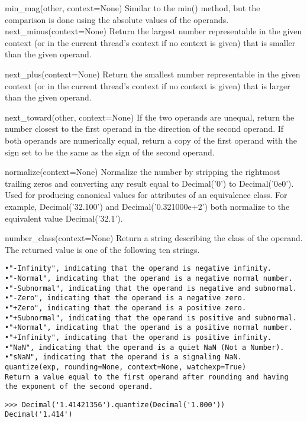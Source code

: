 min\_mag(other, context=None)
Similar to the min() method, but the comparison is done using the absolute values of the operands.
next\_minus(context=None)
Return the largest number representable in the given context (or in the current thread’s context if no context is given) that is smaller than the given operand.

next\_plus(context=None)
Return the smallest number representable in the given context (or in the current thread’s context if no context is given) that is larger than the given operand.

next\_toward(other, context=None)
If the two operands are unequal, return the number closest to the first operand in the direction of the second operand. If both operands are numerically equal, return a copy of the first operand with the sign set to be the same as the sign of the second operand.

normalize(context=None)
Normalize the number by stripping the rightmost trailing zeros and converting any result equal to Decimal('0') to Decimal('0e0'). Used for producing canonical values for attributes of an equivalence class. For example, Decimal('32.100') and Decimal('0.321000e+2') both normalize to the equivalent value Decimal('32.1').

number\_class(context=None)
Return a string describing the class of the operand. The returned value is one of the following ten strings.

\begin{lstlisting}
•"-Infinity", indicating that the operand is negative infinity.
•"-Normal", indicating that the operand is a negative normal number.
•"-Subnormal", indicating that the operand is negative and subnormal.
•"-Zero", indicating that the operand is a negative zero.
•"+Zero", indicating that the operand is a positive zero.
•"+Subnormal", indicating that the operand is positive and subnormal.
•"+Normal", indicating that the operand is a positive normal number.
•"+Infinity", indicating that the operand is positive infinity.
•"NaN", indicating that the operand is a quiet NaN (Not a Number).
•"sNaN", indicating that the operand is a signaling NaN.
quantize(exp, rounding=None, context=None, watchexp=True)
Return a value equal to the first operand after rounding and having the exponent of the second operand.
\end{lstlisting}

\begin{lstlisting}
>>> Decimal('1.41421356').quantize(Decimal('1.000'))
Decimal('1.414')
\end{lstlisting}

